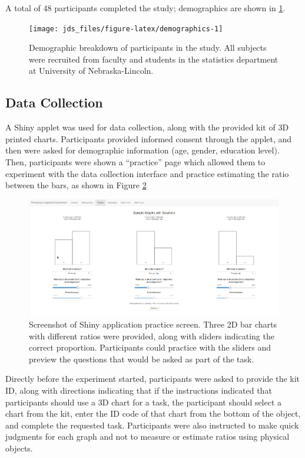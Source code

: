 \documentclass[letterpaper,inpress,dvipsnames]{jdsart}
\begin{document}
A total of 48 participants completed the study; demographics are shown in \ref{fig:demographics}.

\begin{figure}
\texttt{[image: jds\_files/figure-latex/demographics-1]} \caption{Demographic breakdown of participants in the study. All subjects were recruited from faculty and students in the statistics department at University of Nebraska-Lincoln.}\label{fig:demographics}
\end{figure}

\hypertarget{data-collection}{%
\subsection{Data Collection}\label{data-collection}}

A Shiny applet was used for data collection, along with the provided kit of 3D printed charts.
Participants provided informed consent through the applet, and then were asked for demographic information (age, gender, education level).
Then, participants were shown a ``practice'' page which allowed them to experiment with the data collection interface and practice estimating the ratio between the bars, as shown in Figure \ref{fig:practice}

\begin{figure}
\includegraphics[width=0.8\linewidth]{_images/03-Practice-2} \caption{Screenshot of Shiny application practice screen. Three 2D bar charts with different ratios were provided, along with sliders indicating the correct proportion. Participants could practice with the sliders and preview the questions that would be asked as part of the task.}\label{fig:practice}
\end{figure}

Directly before the experiment started, participants were asked to provide the kit ID, along with directions indicating that if the instructions indicated that participants should use a 3D chart for a task, the participant should select a chart from the kit, enter the ID code of that chart from the bottom of the object, and complete the requested task.
Participants were also instructed to make quick judgments for each graph and not to measure or estimate ratios using physical objects.
\end{document}
